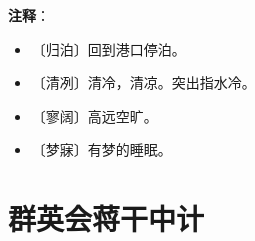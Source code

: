 \documentclass[12pt,UTF-8,openany]{ctexbook}
\begin{document}
\newpage

\textbf{注释}：

\vspace{-1em}

\begin{itemize}
    \setlength\itemsep{-0.2em}
    \item 〔归泊〕回到港口停泊。
    \item 〔清冽〕清冷，清凉。突出指水冷。
    \item 〔寥阔〕高远空旷。
    \item 〔梦寐〕有梦的睡眠。
\end{itemize}

\chapter{群英会蒋干中计}
\end{document}
